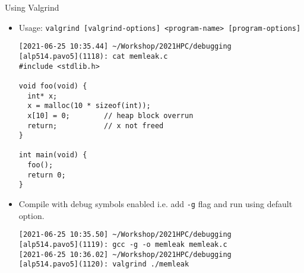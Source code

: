 \documentclass[10pt,t]{beamer}
\begin{document}
\begin{frame}[fragile]{Using Valgrind}
  \begin{itemize}
  \item Usage: \lstinline|valgrind [valgrind-options] <program-name> [program-options]|
    \begin{lstlisting}
[2021-06-25 10:35.44] ~/Workshop/2021HPC/debugging
[alp514.pavo5](1118): cat memleak.c
#include <stdlib.h>

void foo(void) {
  int* x;
  x = malloc(10 * sizeof(int));
  x[10] = 0;        // heap block overrun
  return;           // x not freed
}

int main(void) {
  foo();
  return 0;
}
    \end{lstlisting}
    \item Compile with debug symbols enabled i.e. add \lstinline|-g| flag and run using default option.
      \begin{lstlisting}
[2021-06-25 10:35.50] ~/Workshop/2021HPC/debugging
[alp514.pavo5](1119): gcc -g -o memleak memleak.c
[2021-06-25 10:36.02] ~/Workshop/2021HPC/debugging
[alp514.pavo5](1120): valgrind ./memleak
      \end{lstlisting}
  \end{itemize}
\end{frame}
\end{document}
